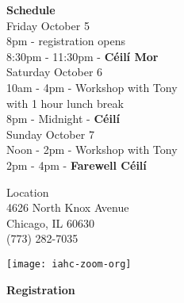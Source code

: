 \documentclass[12pt,
letterpaper]{leaflet}
\begin{document}
\begin{flushleft}
{\large \textbf{Schedule}}\\ 
\vspace*{2em}
Friday October 5\\
\hspace*{3em}  8pm  - registration opens\\
\hspace*{3em}  8:30pm  - 11:30pm  - \textbf{C\'{e}il\'{i} Mor}\\

Saturday October 6\\
\hspace*{3em}  10am - 4pm  - Workshop with Tony\\
\hspace*{3em}  {\small with 1 hour lunch break}\\

\hspace*{3em}  8pm - Midnight - \textbf{C\'{e}il\'{i}}\\

Sunday October 7\\
\hspace*{3em}  Noon - 2pm  - Workshop  with Tony \\

 \hspace*{3em} 2pm - 4pm - \textbf{Farewell C\'{e}il\'{i}}\\
\end{flushleft}

Location\\
4626 North Knox Avenue\\
Chicago, IL 60630\\
(773) 282-7035
%

\vspace*{0.05em}
\begin{center}
\texttt{[image: iahc-zoom-org]}
\end{center}

\pagebreak
\begin{flushleft}
{\Large \textbf{Registration}}
\end{flushleft}
\end{document}
